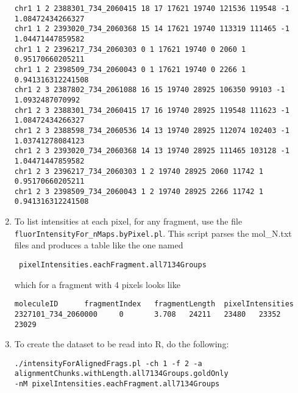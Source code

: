 \documentclass[11pt]{article}
\begin{document}
\begin{enumerate}
\begin{verbatim}
chr1 1 2 2388301_734_2060415 18 17 17621 19740 121536 119548 -1 1.08472434266327
chr1 1 2 2393020_734_2060368 15 14 17621 19740 113319 111465 -1 1.04471447859582
chr1 1 2 2396217_734_2060303 0 1 17621 19740 0 2060 1 0.95170660205211
chr1 1 2 2398509_734_2060043 0 1 17621 19740 0 2266 1 0.941316312241508
chr1 2 3 2387802_734_2061088 16 15 19740 28925 106350 99103 -1 1.0932487070992
chr1 2 3 2388301_734_2060415 17 16 19740 28925 119548 111623 -1 1.08472434266327
chr1 2 3 2388598_734_2060536 14 13 19740 28925 112074 102403 -1 1.03741278084123
chr1 2 3 2393020_734_2060368 14 13 19740 28925 111465 103128 -1 1.04471447859582
chr1 2 3 2396217_734_2060303 1 2 19740 28925 2060 11742 1 0.95170660205211
chr1 2 3 2398509_734_2060043 1 2 19740 28925 2266 11742 1 0.941316312241508
\end{verbatim}
\item
To list intensities at each pixel, for any fragment, use the file \texttt{fluorIntensityFor\_nMaps.byPixel.pl}. This script parses the mol\_N.txt files and produces a table like the one named \begin{verbatim} pixelIntensities.eachFragment.all7134Groups \end{verbatim}
which for a fragment with 4 pixels looks like
\begin{verbatim}
moleculeID      fragmentIndex   fragmentLength  pixelIntensities
2327101_734_2060000     0       3.708   24211   23480   23352   23029
\end{verbatim}
\item
To create the dataset to be read into R, do the following:\\
\begin{verbatim}
./intensityForAlignedFrags.pl -ch 1 -f 2 -a 
alignmentChunks.withLength.all7134Groups.goldOnly 
-nM pixelIntensities.eachFragment.all7134Groups
\end{verbatim}


\end{enumerate}
\end{document}
